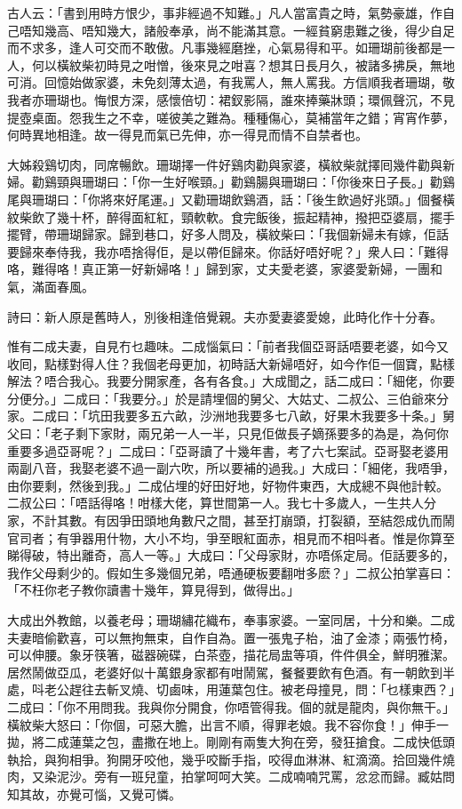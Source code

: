\documentclass[a5paper, 12pt, openany]{book} %
\begin{document}
	古人云：「書到用時方恨少，事非經過不知難。」凡人當富貴之時，氣勢豪雄，作自己唔知幾高、唔知幾大，諸般奉承，尚不能滿其意。一經貧窮患難之後，得少自足而不求多，逢人可交而不敢傲。凡事幾經磨挫，心氣易得和平。如珊瑚前後都是一人，何以橫紋柴初時見之咁憎，後來見之咁喜？想其日長月久，被諸多拂戾，無地可消。回憶始做家婆，未免刻薄太過，有我罵人，無人罵我。方信順我者珊瑚，敬我者亦珊瑚也。悔恨方深，感懷倍切：裙釵影隔，誰來捧藥牀頭；環佩聲沉，不見提壺桌面。怨我生之不幸，嗟彼美之難為。種種傷心，莫補當年之錯；宵宵作夢，何時異地相逢。故一得見而氣已先伸，亦一得見而情不自禁者也。

	大姊殺鷄切肉，同席暢飲。珊瑚擇一件好鷄肉勸與家婆，橫紋柴就擇囘幾件勸與新婦。勸鷄頸與珊瑚曰：「你一生好喉頸。」勸鷄腸與珊瑚曰：「你後來日子長。」勸鷄尾與珊瑚曰：「你將來好尾運。」又勸珊瑚飲鷄酒，話：「後生飲過好兆頭。」個餐橫紋柴飲了幾十杯，醉得面紅紅，頸軟軟。食完飯後，振起精神，撥把亞婆扇，擺手擺臂，帶珊瑚歸家。歸到巷口，好多人問及，橫紋柴曰：「我個新婦未有嫁，佢話要歸來奉侍我，我亦唔捨得佢，是以帶佢歸來。你話好唔好呢？」衆人曰：「難得咯，難得咯！真正第一好新婦咯！」歸到家，丈夫愛老婆，家婆愛新婦，一團和氣，滿面春風。

	詩曰：新人原是舊時人，別後相逢倍覺親。夫亦愛妻婆愛媳，此時化作十分春。

	惟有二成夫妻，自見冇乜趣味。二成惱氣曰：「前者我個亞哥話唔要老婆，如今又收囘，點樣對得人住？我個老母更加，初時話大新婦唔好，如今作佢一個寶，點樣解法？唔合我心。我要分開家產，各有各食。」大成聞之，話二成曰：「細佬，你要分便分。」二成曰：「我要分。」於是請埋個的舅父、大姑丈、二叔公、三伯爺來分家。二成曰：「坑田我要多五六畝，沙洲地我要多七八畝，好果木我要多十条。」舅父曰：「老子剩下家財，兩兄弟一人一半，只見佢做長子嫡孫要多的為是，為何你重要多過亞哥呢？」二成曰：「亞哥讀了十幾年書，考了六七案試。亞哥娶老婆用兩副八音，我娶老婆不過一副六吹，所以要補的過我。」大成曰：「細佬，我唔爭，由你要剩，然後到我。」二成佔埋的好田好地，好物件東西，大成總不與他計較。二叔公曰：「唔話得咯！咁樣大佬，算世間第一人。我七十多歲人，一生共人分家，不計其數。有因爭田頭地角數尺之間，甚至打崩頭，打裂額，至結怨成仇而鬧官司者；有爭器用什物，大小不均，爭至眼紅面赤，相見而不相呌者。惟是你算至睇得破，特出離奇，高人一等。」大成曰：「父母家財，亦唔係定局。佢話要多的，我作父母剩少的。假如生多幾個兄弟，唔通硬板要翻咁多麽？」二叔公拍掌喜曰：「不枉你老子教你讀書十幾年，算見得到，做得出。」

	大成出外教館，以養老母；珊瑚繡花織布，奉事家婆。一室同居，十分和樂。二成夫妻暗偷歡喜，可以無拘無束，自作自為。置一張鬼子枱，油了金漆；兩張竹椅，可以伸腰。象牙筷箸，磁器碗碟，白茶壺，描花局盅等項，件件俱全，鮮明雅潔。居然鬧做亞瓜，老婆好似十萬銀身家都有咁鬧駕，餐餐要飲有色酒。有一朝飲到半處，呌老公趕往去斬叉燒、切鹵味，用蓮葉包住。被老母撞見，問：「乜樣東西？」二成曰：「你不用問我。我與你分開食，你唔管得我。個的就是龍肉，與你無干。」橫紋柴大怒曰：「你個，可惡大膽，出言不順，得罪老娘。我不容你食！」伸手一拋，將二成蓮葉之包，盡撒在地上。剛剛有兩隻大狗在旁，發狂搶食。二成快低頭執拾，與狗相爭。狗開牙咬他，幾乎咬斷手指，咬得血淋淋、紅滴滴。拾回幾件燒肉，又染泥沙。旁有一班兒童，拍掌呵呵大笑。二成喃喃咒罵，忿忿而歸。臧姑問知其故，亦覺可惱，又覺可憐。
\end{document}
